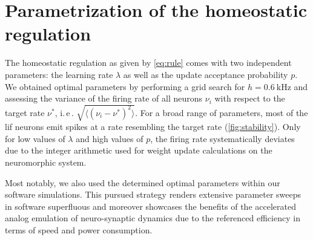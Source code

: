 \section{Parametrization of the homeostatic regulation \label{sec:hom_parametrization}}

The homeostatic regulation as given by \cref{eq:rule} comes with two independent parameters: the learning rate $\lambda$ as well as the update acceptance probability $p$.
We obtained optimal parameters by performing a grid search for $h = \SI{0.6}{\kilo\hertz}$ and assessing the variance of the firing rate of all neurons $\nu_i$ with respect to the target rate $\nu^\ast$, i.\,e\,. $\sqrt{\langle \left(\nu_i - \nu^\ast\right)^2\rangle}$.
For a broad range of parameters, most of the \gls{lif} neurons emit spikes at a rate resembling the target rate (\cref{fig:stability}).
Only for low values of $\lambda$ and high values of $p$, the firing rate systematically deviates due to the integer arithmetic used for weight update calculations on the neuromorphic system.

Most notably, we also used the determined optimal parameters within our software simulations.
This pursued strategy renders extensive parameter sweeps in software superfluous and moreover showcases the benefits of the accelerated analog emulation of neuro-synaptic dynamics due to the referenced efficiency in terms of speed and power consumption.


